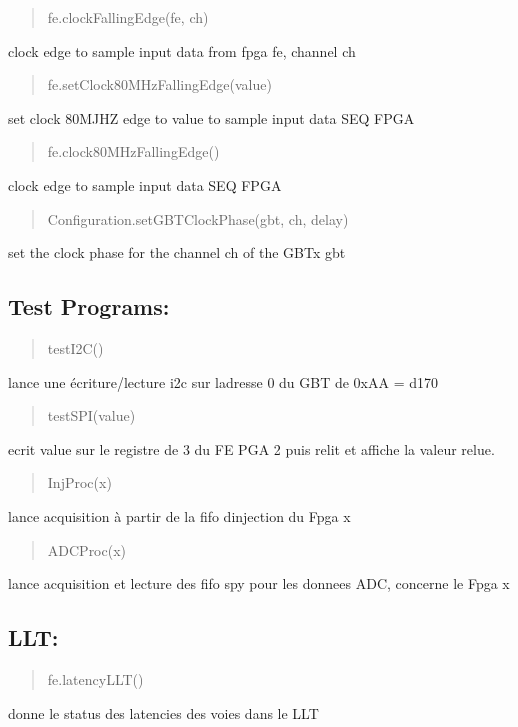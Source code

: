 \begin{quote}
fe.\+clock\+Falling\+Edge(fe, ch) \end{quote}
clock edge to sample input data from fpga fe, channel ch

\begin{quote}
fe.\+set\+Clock80\+M\+Hz\+Falling\+Edge(value) \end{quote}
set clock 80\+M\+J\+HZ edge to value to sample input data S\+EQ F\+P\+GA

\begin{quote}
fe.\+clock80\+M\+Hz\+Falling\+Edge() \end{quote}
clock edge to sample input data S\+EQ F\+P\+GA

\begin{quote}
Configuration.\+set\+G\+B\+T\+Clock\+Phase(gbt, ch, delay) \end{quote}
set the clock phase for the channel ch of the G\+B\+Tx gbt

\subsection*{Test Programs\+: }

\begin{quote}
test\+I2\+C() \end{quote}
lance une écriture/lecture i2c sur l\textquotesingle{}adresse 0 du G\+BT de 0x\+AA = d170

\begin{quote}
test\+S\+P\+I(value) \end{quote}
ecrit value sur le registre de 3 du FE P\+GA 2 puis relit et affiche la valeur relue.

\begin{quote}
Inj\+Proc(x) \end{quote}
lance acquisition à partir de la fifo d\textquotesingle{}injection du Fpga x

\begin{quote}
A\+D\+C\+Proc(x) \end{quote}


lance acquisition et lecture des fifo spy pour les donnees A\+DC, concerne le Fpga x

\subsection*{L\+LT\+: }

\begin{quote}
fe.\+latency\+L\+L\+T() \end{quote}
donne le status des latencies des voies dans le L\+LT

